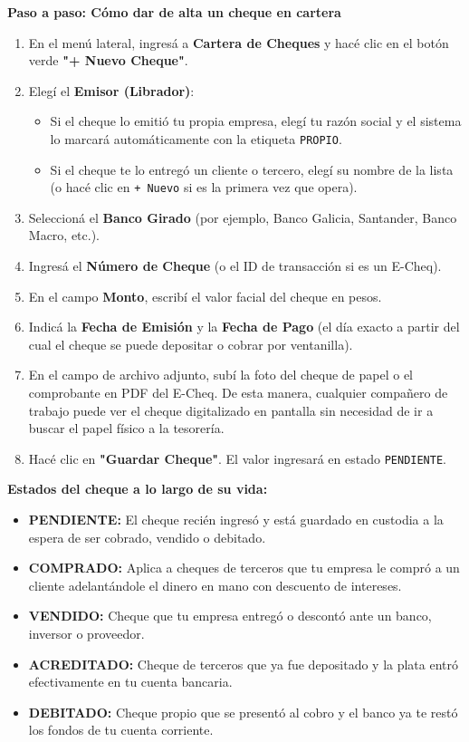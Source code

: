 \documentclass[12pt,a4paper]{article}
\renewcommand{\_}{\textunderscore\allowbreak}
\begin{document}
\textbf{Paso a paso: Cómo dar de alta un cheque en cartera}
\begin{enumerate}
    \item En el menú lateral, ingresá a \textbf{Cartera de Cheques} y hacé clic en el botón verde \textbf{"+ Nuevo Cheque"}.
    \item Elegí el \textbf{Emisor (Librador)}:
          \begin{itemize}
              \item Si el cheque lo emitió tu propia empresa, elegí tu razón social y el sistema lo marcará automáticamente con la etiqueta \texttt{PROPIO}.
              \item Si el cheque te lo entregó un cliente o tercero, elegí su nombre de la lista (o hacé clic en \texttt{+ Nuevo} si es la primera vez que opera).
          \end{itemize}
    \item Seleccioná el \textbf{Banco Girado} (por ejemplo, Banco Galicia, Santander, Banco Macro, etc.).
    \item Ingresá el \textbf{Número de Cheque} (o el ID de transacción si es un E-Cheq).
    \item En el campo \textbf{Monto}, escribí el valor facial del cheque en pesos.
    \item Indicá la \textbf{Fecha de Emisión} y la \textbf{Fecha de Pago} (el día exacto a partir del cual el cheque se puede depositar o cobrar por ventanilla).
    \item En el campo de archivo adjunto, subí la foto del cheque de papel o el comprobante en PDF del E-Cheq. De esta manera, cualquier compañero de trabajo puede ver el cheque digitalizado en pantalla sin necesidad de ir a buscar el papel físico a la tesorería.
    \item Hacé clic en \textbf{"Guardar Cheque"}. El valor ingresará en estado \texttt{PENDIENTE}.
\end{enumerate}

\textbf{Estados del cheque a lo largo de su vida:}
\begin{itemize}
    \item \textbf{PENDIENTE:} El cheque recién ingresó y está guardado en custodia a la espera de ser cobrado, vendido o debitado.
    \item \textbf{COMPRADO:} Aplica a cheques de terceros que tu empresa le compró a un cliente adelantándole el dinero en mano con descuento de intereses.
    \item \textbf{VENDIDO:} Cheque que tu empresa entregó o descontó ante un banco, inversor o proveedor.
    \item \textbf{ACREDITADO:} Cheque de terceros que ya fue depositado y la plata entró efectivamente en tu cuenta bancaria.
    \item \textbf{DEBITADO:} Cheque propio que se presentó al cobro y el banco ya te restó los fondos de tu cuenta corriente.
\end{itemize}
\end{document}
